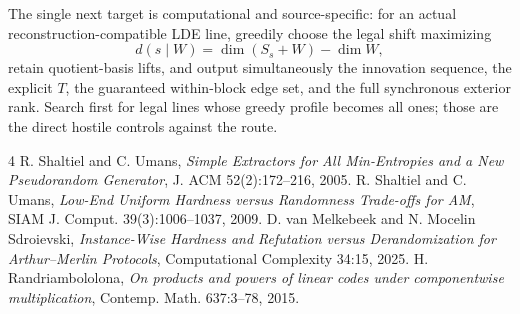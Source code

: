 \documentclass[11pt]{article}
\begin{document}
The single next target is computational and source-specific: for an actual reconstruction-compatible LDE line, greedily choose the legal shift maximizing
\[
d(s\mid W)=\dim(S_s+W)-\dim W,
\]
retain quotient-basis lifts, and output simultaneously the innovation sequence, the explicit $T$, the guaranteed within-block edge set, and the full synchronous exterior rank. Search first for legal lines whose greedy profile becomes all ones; those are the direct hostile controls against the route.

\begin{thebibliography}{4}
 R. Shaltiel and C. Umans, \emph{Simple Extractors for All Min-Entropies and a New Pseudorandom Generator}, J. ACM 52(2):172--216, 2005.
 R. Shaltiel and C. Umans, \emph{Low-End Uniform Hardness versus Randomness Trade-offs for AM}, SIAM J. Comput. 39(3):1006--1037, 2009.
 D. van Melkebeek and N. Mocelin Sdroievski, \emph{Instance-Wise Hardness and Refutation versus Derandomization for Arthur--Merlin Protocols}, Computational Complexity 34:15, 2025.
 H. Randriambololona, \emph{On products and powers of linear codes under componentwise multiplication}, Contemp. Math. 637:3--78, 2015.
\end{thebibliography}
\end{document}
